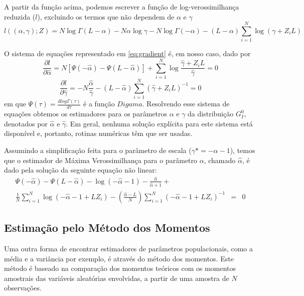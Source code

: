 \documentclass[12pt]{article}
\begin{document}
A partir da função acima, podemos escrever a função de log-verossimilhança reduzida ($l$), excluindo os termos que não dependem de $\alpha$ e $\gamma$
\begin{equation}
    l((\alpha, \gamma); Z) = N\log\Gamma(L-\alpha) - N\alpha \log\gamma - N\log\Gamma(-\alpha) - (L-\alpha)\sum_{i=1}^{N}\log(\gamma +Z_iL) \label{eq:logVerRed}
\end{equation}

O sistema de equações representado em \eqref{eq:gradient} é, em nosso caso, dado por
\begin{equation}
  \frac{\partial l}{\partial \widehat{\alpha}} = N[\Psi(-\widehat{\alpha}) - \Psi(L-\widehat{\alpha})] + \sum_{i=1}^{N}\log\frac{\widehat{\gamma} + Z_iL}{\widehat{\gamma}} = 0
\end{equation}
\begin{equation}
   \frac{\partial l}{\partial \widehat{\gamma}} = -N\frac{\widehat{\alpha}}{\widehat{\gamma}} - (L - \widehat{\alpha})\sum_{i=1}^{N}(\widehat{\gamma} + Z_iL)^{-1} = 0
\end{equation}
em que $\Psi(\tau) = \frac{\textit{d}log\Gamma(\tau)}{\textit{d}\tau}$ é a função $Digama$. Resolvendo esse sistema de equações obtemos os estimadores para os parâmetros $\alpha$ e $\gamma$ da distribuição $G_I^0$, denotados por $\widehat{\alpha}$ e $\widehat{\gamma}$. Em geral, nenhuma solução explícita para este sistema está disponível e, portanto, rotinas numéricas têm que ser usadas.

Assumindo a simplificação feita para o parâmetro de escala ($\gamma* = -\alpha - 1$), temos que o estimador de Máxima Verossimilhança para o parâmetro $\alpha$, chamado $\widehat{\alpha}$, é dado pela solução da seguinte equação não linear:
\begin{eqnarray}
    \Psi(-\widehat{\alpha}) - \Psi(L-\widehat{\alpha}) - \log(-\widehat{\alpha}-1) - \frac{\widehat{\alpha}}{\widehat{\alpha}+1} + \nonumber \\ \frac{1}{N}\sum_{i=1}^{N}\log(-\widehat{\alpha} - 1 + LZ_i) - \left ( \frac{\widehat{\alpha}-L}{N} \right )\sum_{i=1}^{N}(-\widehat{\alpha} - 1 + LZ_i)^{-1} & = & 0
\end{eqnarray}

\subsection{Estimação pelo Método dos Momentos}

Uma outra forma de encontrar estimadores de parâmetros populacionais, como a média e a variância por exemplo, é através do método dos momentos. Este método é baseado na comparação dos momentos teóricos com os momentos amostrais das variáveis aleatórias envolvidas, a partir de uma amostra de $N$ observações.
\end{document}
